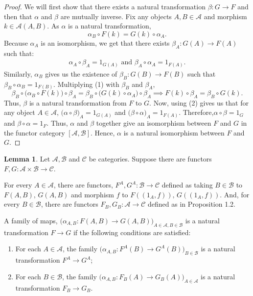 \documentclass[a4paper]{article}
\theoremstyle{definition}
\newtheorem{lemma}[theorem]{Lemma}
\begin{document}
	\begin{proof}\setcounter{equation}{0}
		We will first show that there exists a natural transformation $\beta:G \to F$
		and then that $\alpha$ and $\beta$ are mutually inverse.
		Fix any objects $A,B\in \mathcal{A} $ and morphism $k \in \mathcal{A}(A,B)$. As
		$\alpha$ is a natural transformation,
		\begin{equation}
			\alpha_B \circ F(k) = G(k) \circ \alpha_A.
		\end{equation}
		Because $\alpha_A$ is an isomorphism, we get that
		there exists
		$\beta_A:G(A)\to F(A)$ such that:
		\begin{align}
			\alpha_A \circ \beta_A = 1_{G(A)} \text{ and }
			\beta_A \circ \alpha_A = 1_{F(A)}.
		\end{align}
		Similarly, $\alpha_B$ gives us the existence of $\beta_B:G(B)\to F(B)$
		such that $\beta_B \circ \alpha_B = 1_{F(B)}$. Multiplying (1) with $\beta_B$ and
		$\beta_A$,
		\begin{equation}
			\beta_B^{} \circ \big( \alpha_B^{} \circ F(k) \big) \circ \beta_A^{} =
			\beta_B^{} \circ \big( G(k) \circ \alpha_A^{} \big) \circ \beta_A^{}
			\implies  F(k) \circ \beta_A^{} =\beta_B^{} \circ G(k).
		\end{equation}
		Thus, $\beta$ is a natural transformation from $F$ to $G$. Now, using (2) gives us
		that for any object $A\in \mathcal{A} $, $\big( \alpha \circ \beta \big)_A = 1_{G(A)}$ and
		$\big( \beta \circ \alpha \big)_A = 1_{F(A)}$.
		Therefore,$\alpha \circ \beta = 1_G$ and $\beta \circ \alpha =1_F$.
		Thus, $\alpha$ and $\beta$ together give an isomorphism between $F$ and $G$
		in the functor category
		$[\mathcal{A},\mathcal{B}]$. Hence, $\alpha$ is a natural isomorphism between $F$
		and $G$.
	\end{proof}
	\begin{lemma}
		Let $\mathcal{A},\mathcal{B}$ and $\mathcal{C}$ be categories. Suppose there
		are functors $F,G:\mathcal{A} \times \mathcal{B} \to \mathcal{C}$.

		For every $A\in \mathcal{A}$, there are functors, $F^A,G^A:\mathcal{B} \to \mathcal{C}$
		defined as taking $B \in \mathcal{B}$ to $F(A,B),\, G(A,B)$ and
		morphism $f$ to $F((1_A,f)),\, G((1_A,f)) $. And, for every $B\in \mathcal{B}$,
		there are functors $F_B,G_B:\mathcal{A} \to \mathcal{C}$ defined as
		in Proposition 1.2.

		A family of maps, $\big( \alpha_{A,B}: F(A,B) \to G(A,B)
		\big)_{A \in \mathcal{A} , B \in \mathcal{B} } $ is a natural transformation
		$F \to G$ if the following conditions are satisfied:
		\begin{enumerate}[label=(\roman*)]
			\item For each $A \in \mathcal{A}$, the family
				$\big( \alpha_{A,B}: F^A(B) \to G^A(B) \big)_{ B \in \mathcal{B} } $ is
				a natural transformation $F^A \to G^A$;
			\item For each $B \in \mathcal{B}$, the family
				$\big( \alpha_{A,B}: F_B(A) \to G_B(A) \big)_{ A \in \mathcal{A} } $ is
				a natural transformation $F_B \to G_B$.
		\end{enumerate}
	\end{lemma}
\end{document}
